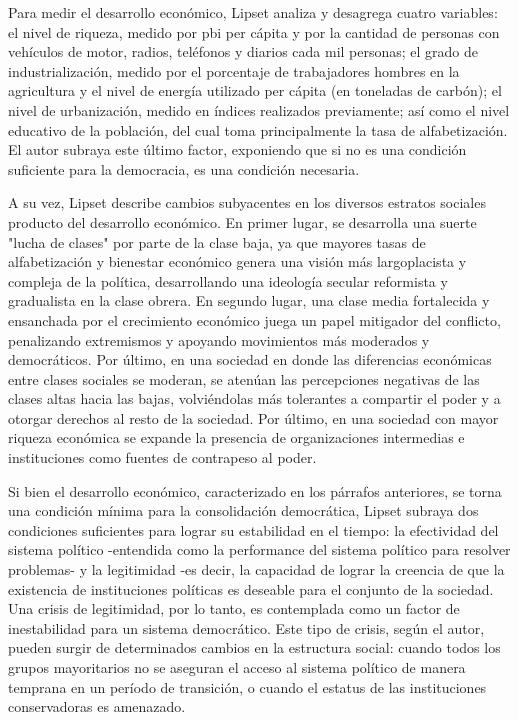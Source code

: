 \documentclass{article}
\begin{document}
Para medir el desarrollo económico, Lipset analiza y desagrega cuatro variables:
el nivel de riqueza, medido por pbi per cápita y por la cantidad de personas con vehículos 
de motor, radios, teléfonos y diarios cada mil personas; el grado de industrialización, 
medido por el porcentaje de trabajadores hombres en la agricultura y el nivel de energía 
utilizado per cápita (en toneladas de carbón); el nivel de urbanización, medido en índices 
realizados previamente; así como el nivel educativo de la población, del cual toma 
principalmente la tasa de alfabetización. El autor subraya este último factor, exponiendo
que si no es una condición suficiente para la democracia, es una condición necesaria.

A su vez, Lipset describe cambios subyacentes en los diversos estratos sociales producto
del desarrollo económico. En primer lugar, se desarrolla una suerte "lucha de clases" por 
parte de la clase baja, ya que mayores tasas de alfabetización y bienestar económico genera 
una visión más largoplacista y compleja de la política, desarrollando una ideología secular
reformista y gradualista en la clase obrera. En segundo lugar, una clase media fortalecida y 
ensanchada por el crecimiento económico juega un papel mitigador del conflicto, penalizando 
extremismos y apoyando movimientos más moderados y democráticos. Por último, en una sociedad 
en donde las diferencias económicas entre clases sociales se moderan, se atenúan las 
percepciones negativas de las clases altas hacia las bajas, volviéndolas más tolerantes a 
compartir el poder y a otorgar derechos al resto de la sociedad. Por último, en una sociedad 
con mayor riqueza económica se expande la presencia de organizaciones intermedias e 
instituciones como fuentes de contrapeso al poder.

Si bien el desarrollo económico, caracterizado en los párrafos anteriores, se torna una
condición mínima para la consolidación democrática, Lipset subraya dos condiciones 
suficientes para lograr su estabilidad en el tiempo: la efectividad del sistema político 
-entendida como la performance del sistema político para resolver problemas- y la 
legitimidad -es decir, la capacidad de lograr la creencia de que la  existencia de 
instituciones políticas es deseable para el conjunto de la sociedad. Una crisis de 
legitimidad, por lo tanto, es contemplada como un factor de inestabilidad para un sistema 
democrático. Este tipo de crisis, según el autor, pueden surgir de determinados cambios 
en la estructura social: cuando todos los grupos mayoritarios no se aseguran el acceso al 
sistema político de manera temprana en un período de transición, o cuando el estatus de 
las instituciones conservadoras es amenazado.
\end{document}
